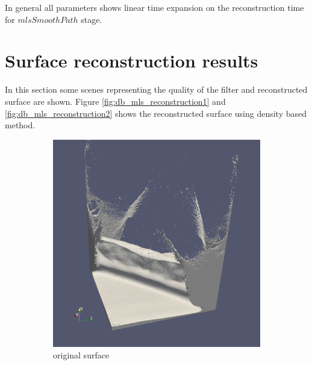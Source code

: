 In general all parameters shows linear time expansion on the reconstruction time for $mlsSmoothPath$ stage.

\section{Surface reconstruction results}
In this section some scenes representing the quality of the filter and reconstructed surface are shown. 
Figure \ref{fig:db_mls_reconstruction1} and \ref{fig:db_mls_reconstruction2} shows the reconstructed surface using density based method.
\begin{figure}
	\begin{center}
		\begin{subfigure}[b]{0.47\textwidth}
			\includegraphics[width=\textwidth]{figures/DDMOriginal1.png}
			\caption{original surface}
		\end{subfigure}
		\begin{subfigure}[b]{0.47\textwidth}

\end{subfigure}
\end{center}
\end{figure}
